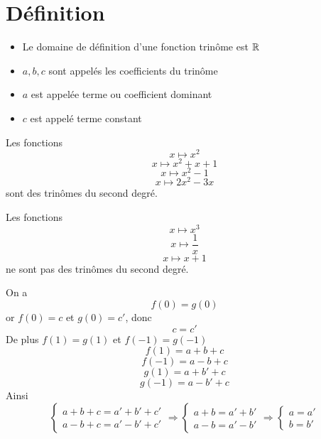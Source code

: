 \section{Définition}
\newline
\begin{remarques}
\begin{itemize}
\item Le domaine de définition d'une fonction trinôme est $\mathbb{R}$
\item $a,b,c$ sont appelés les coefficients du trinôme
\item $a$ est appelée terme ou coefficient dominant
\item $c$ est appelé terme constant
\end{itemize}
\end{remarques}
\begin{exemples}
Les fonctions $$x \mapsto x^2$$ $$x \mapsto x^2 + x + 1$$ $$x \mapsto x^2-1$$ $$x\mapsto 2x^2-3x$$ sont des trinômes du second degré. \newline \newline

Les fonctions $$x \mapsto x^3$$ $$x \mapsto \dfrac{1}{x}$$ $$x \mapsto x+1$$ ne sont pas des trinômes du second degré.
\end{exemples}
\newline
\begin{preuve}
On a $$f(0) = g(0)$$
or $f(0) = c$ et $g(0) = c'$, donc $$c = c'$$
De plus $f(1) =g(1)$ et $f(-1) = g(-1)$
$$f(1) = a+b+c$$
$$f(-1) = a-b+c$$
$$g(1) = a+b'+c$$
$$g(-1) = a-b'+c$$
Ainsi 
$$\left\{
\begin{array}{l}
  a + b + c = a' + b' + c' \\
  a - b + c = a' - b' + c'
\end{array}
\right. \Rightarrow 
\left\{ \begin{array}{l}
  a + b = a' + b' \\
  a - b  = a' - b'
\end{array} \right. \Rightarrow \left\{ \begin{array}{l}
  a = a'\\
  b  =  b'
\end{array} \right. $$
\end{preuve}
